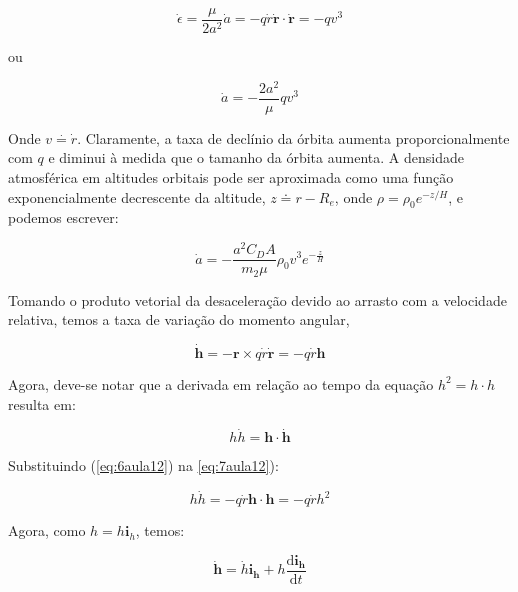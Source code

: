 \begin{equation}
\dot{\epsilon}=\frac{\mu}{2 a^2} \dot{a}=-q \dot{r} \dot{\mathbf{r}} \cdot \dot{\mathbf{r}}=-q v^3
\label{eq:3aula12}
\end{equation}

ou 

\begin{equation}
\dot{a}=-\frac{2 a^2}{\mu} q v^3
\label{eq:4aula12}
\end{equation}

Onde $v\stackrel{\cdot}{=}\dot{r}$. Claramente, a taxa de declínio da órbita aumenta proporcionalmente com $q$ e diminui à medida que o tamanho da órbita aumenta. A densidade atmosférica em altitudes orbitais pode ser aproximada como uma função exponencialmente decrescente da altitude, $z\doteq r-R_e$, onde $\rho = \rho_0e^{-z/H}$, e podemos escrever: 

\begin{equation}
\dot{a}=-\frac{a^2 C_D A}{m_2 \mu} \rho_0 v^3 e^{-\frac{z}{H}}
\label{eq:5aula12}
\end{equation}

Tomando o produto vetorial da desaceleração devido ao arrasto com a velocidade relativa, temos a taxa de variação do momento angular,

\begin{equation}
\dot{\textbf{h}}=-\textbf{r}\times q\dot{r}\dot{\textbf{r}}=-q\dot{r}\textbf{h}
\label{eq:6aula12}
\end{equation}

Agora, deve-se notar que a derivada em relação ao tempo da equação $h^2 = h \cdot h$ resulta em:

\begin{equation}
h \dot{h}=\mathbf{h} \cdot \dot{\mathbf{h}}
\label{eq:7aula12}
\end{equation}

Substituindo (\ref{eq:6aula12}) na \ref{eq:7aula12}):

\begin{equation}
h\dot{h}=-q\dot{r}\mathbf{h}\cdot\mathbf{h}=-q\dot{r}h^2
\label{eq:8aula12}
\end{equation}

Agora, como $h = h\textbf{i}_h$, temos:

\begin{equation}
\dot{\textbf{h}}=\dot{h}\textbf{i}_{\textbf{h}}+h\frac{\text{d}\textbf{i}_{\textbf{h}}}{\text{d}t}
\label{eq:9aula12}
\end{equation}

